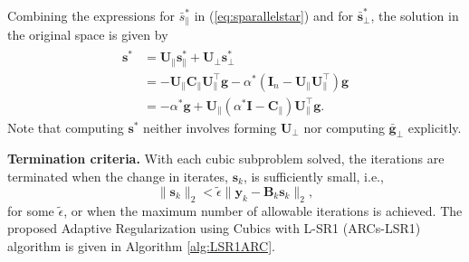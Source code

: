  Combining the expressions for $\bar{s}_{\parallel}^*$ in (\ref{eq:sparallelstar}) and for 
 $\bar{\mathbf{s}}_{\perp}^*$, the solution in the original space is given by
 \begin{align*}
 	\mathbf{s}^* &=
	\mathbf{U}_{\parallel} \mathbf{s}_{\parallel}^* + 
	\mathbf{U}_{\perp}^{\phantom{^*}} \mathbf{s}_{\perp}^* \\
	&=
- \mathbf{U}_{\parallel}\mathbf{C}_{\parallel}\mathbf{U}_{\parallel}^{\top} \mathbf{g} 
- \alpha^* (\mathbf{I}_n - \mathbf{U}_{\parallel}\mathbf{U}_{\parallel}^{\top}) \mathbf{g}\\
&= -\alpha^* \mathbf{g}  + \mathbf{U}_{\parallel}(\alpha^* \mathbf{I} - \mathbf{C}_{\parallel})\mathbf{U}_{\parallel}^{\top} \mathbf{g}.
 \end{align*}
 Note that computing $\mathbf{s}^*$ neither  involves forming $\mathbf{U}_{\perp}$ nor
 computing $\bar{\mathbf{g}}_{\perp}$ explicitly.
 
\bigskip




\noindent \textbf{Termination criteria.} 
With each cubic subproblem solved, the iterations are terminated when 
the change in iterates, $\mathbf{s}_k$, is sufficiently small, i.e., 
\begin{equation}\label{eq:acceptance2}
\| \mathbf{s}_k \|_2 < \tilde{\epsilon} \| \mathbf{y}_k - \mathbf{B}_k \mathbf{s}_k\|_2,
\end{equation}
for some $\tilde{\epsilon}$, 
or when the maximum number of allowable iterations is achieved.
The proposed Adaptive Regularization using Cubics with L-SR1 (ARCs-LSR1) algorithm is given in Algorithm \ref{alg:LSR1ARC}.






